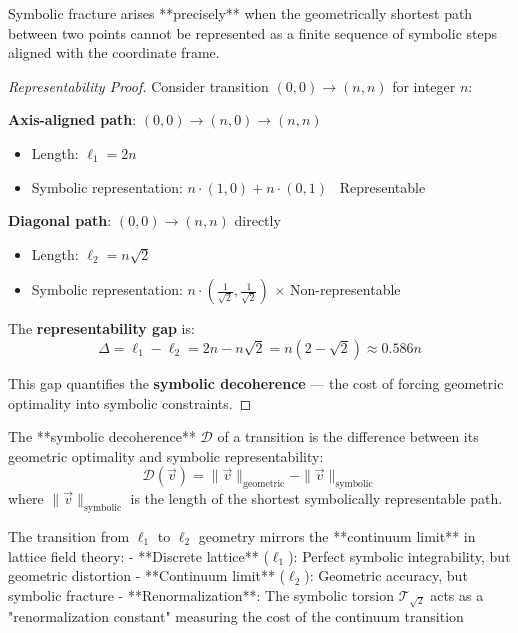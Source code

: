 \begin{lemma}
\label{lemma:bk5_shortest_path_representability}
Symbolic fracture arises **precisely** when the geometrically shortest path between two points cannot be represented as a finite sequence of symbolic steps aligned with the coordinate frame.
\end{lemma}

\begin{proof}[Representability Proof]
\label{proof:bk5_shortest_path_representability}
Consider transition $(0,0) \to (n,n)$ for integer $n$:

\textbf{Axis-aligned path}: $(0,0) \to (n,0) \to (n,n)$
\begin{itemize}
  \item Length: $\ell_1 = 2n$
  \item Symbolic representation: $n \cdot (1,0) + n \cdot (0,1)$ \quad \checkmark\ Representable
\end{itemize}

\textbf{Diagonal path}: $(0,0) \to (n,n)$ directly
\begin{itemize}
  \item Length: $\ell_2 = n\sqrt{2}$
  \item Symbolic representation: $n \cdot \left(\frac{1}{\sqrt{2}}, \frac{1}{\sqrt{2}}\right)$ \quad $\times$ Non-representable
\end{itemize}

The \textbf{representability gap} is:
\[
\Delta = \ell_1 - \ell_2 = 2n - n\sqrt{2} = n(2 - \sqrt{2}) \approx 0.586n
\]

This gap quantifies the \textbf{symbolic decoherence} — the cost of forcing geometric optimality into symbolic constraints.
\end{proof}

\begin{corollary}
\label{corollary:bk5_symbolic_decoherence_theory}
The **symbolic decoherence** $\mathcal{D}$ of a transition is the difference between its geometric optimality and symbolic representability:
$$\mathcal{D}(\vec{v}) = \|\vec{v}\|_{\text{geometric}} - \|\vec{v}\|_{\text{symbolic}}$$
where $\|\vec{v}\|_{\text{symbolic}}$ is the length of the shortest symbolically representable path.
\end{corollary}

\begin{remark}
\label{remark:bk5_lattice_field_theory_analogy}
The transition from $\ell_1$ to $\ell_2$ geometry mirrors the **continuum limit** in lattice field theory:
- **Discrete lattice** ($\ell_1$): Perfect symbolic integrability, but geometric distortion
- **Continuum limit** ($\ell_2$): Geometric accuracy, but symbolic fracture
- **Renormalization**: The symbolic torsion $\mathcal{T}_{\sqrt{2}}$ acts as a "renormalization constant" measuring the cost of the continuum transition
\end{remark}


